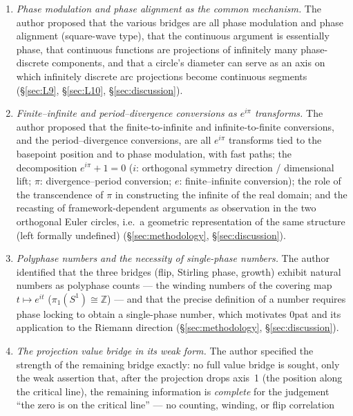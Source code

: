 \documentclass{article}
\newcommand{\Z}{\mathbb{Z}}
\begin{document}
\begin{enumerate}
trigonometric functions and continuing by cumulative values --- a Fourier
phase calibration --- and observed the equivalence of the count with the
lifted integer, and of the lifted integer with the Riemann hypothesis itself
(\S\ref{sec:L10}, \S\ref{sec:L12}).
\item \emph{Phase modulation and phase alignment as the common mechanism.}
The author proposed that the various bridges are all phase modulation and
phase alignment (square-wave type), that the continuous argument is
essentially phase, that continuous functions are projections of infinitely
many phase-discrete components, and that a circle's diameter can serve as an
axis on which infinitely discrete arc projections become continuous segments
(\S\ref{sec:L9}, \S\ref{sec:L10}, \S\ref{sec:discussion}).
\item \emph{Finite--infinite and period--divergence conversions as $e^{i\pi}$
transforms.} The author proposed that the finite-to-infinite and
infinite-to-finite conversions, and the period--divergence conversions, are
all $e^{i\pi}$ transforms tied to the basepoint position and to phase
modulation, with fast paths; the decomposition $e^{i\pi}+1=0$ ($i$:
orthogonal symmetry direction / dimensional lift; $\pi$:
divergence--period conversion; $e$: finite--infinite conversion); the role
of the transcendence of $\pi$ in constructing the infinite of the real
domain; and the recasting of framework-dependent arguments as observation in
the two orthogonal Euler circles, i.e.\ a geometric representation of the
same structure (left formally undefined) (\S\ref{sec:methodology},
\S\ref{sec:discussion}).
\item \emph{Polyphase numbers and the necessity of single-phase numbers.}
The author identified that the three bridges (flip, Stirling phase, growth)
exhibit natural numbers as polyphase counts --- the winding numbers of the
covering map $t\mapsto e^{it}$ ($\pi_1(S^1)\cong\Z$) --- and that the
precise definition of a number requires phase locking to obtain a
single-phase number, which motivates 0pat and its application to the Riemann
direction (\S\ref{sec:methodology}, \S\ref{sec:discussion}).
\item \emph{The projection value bridge in its weak form.} The author
specified the strength of the remaining bridge exactly: no full value
bridge is sought, only the weak assertion that, after the projection
drops axis~1 (the position along the critical line), the remaining
information is \emph{complete} for the judgement ``the zero is on the
critical line'' --- no counting, winding, or flip correlation

\end{enumerate}
\end{document}
